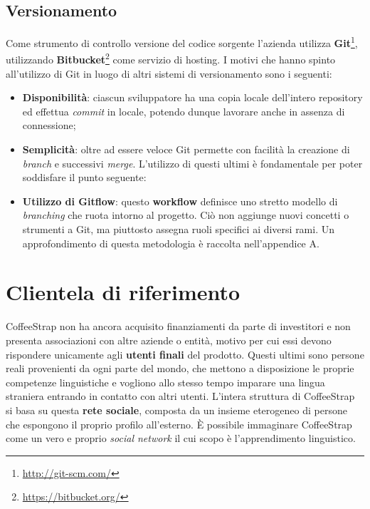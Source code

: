 \subsection{Versionamento}

Come strumento di controllo versione del codice sorgente l'azienda utilizza \textbf{\gls{Git}}\footnote{\url{http://git-scm.com/}}, utilizzando \textbf{Bitbucket}\footnote{\url{https://bitbucket.org/}} come servizio di hosting. I motivi che hanno spinto all'utilizzo di Git in luogo di altri sistemi di versionamento sono i seguenti:

\begin{itemize}

\item \textbf{Disponibilità}: ciascun sviluppatore ha una copia locale dell'intero repository ed effettua \textit{\gls{commit}} in locale, potendo dunque lavorare anche in assenza di connessione;

\item \textbf{Semplicità}: oltre ad essere veloce Git permette con facilità la creazione di \textit{branch} e successivi \textit{\gls{merge}}. L'utilizzo di questi ultimi è fondamentale per poter soddisfare il punto seguente:

\item \textbf{Utilizzo di Gitflow}: questo \textbf{workflow} definisce uno stretto modello di \textit{branching} che ruota intorno al progetto. Ciò non aggiunge nuovi concetti o strumenti a Git, ma piuttosto assegna ruoli specifici ai diversi rami. Un approfondimento di questa metodologia è raccolta nell'appendice A.

\end{itemize}

\section{Clientela di riferimento}

CoffeeStrap non ha ancora acquisito finanziamenti da parte di investitori e non presenta associazioni con altre aziende o entità, motivo per cui essi devono rispondere unicamente agli \textbf{utenti finali} del prodotto. Questi ultimi sono persone reali provenienti da ogni parte del mondo, che mettono a disposizione le proprie competenze linguistiche e vogliono allo stesso tempo imparare una lingua straniera entrando in contatto con altri utenti. L'intera struttura di CoffeeStrap si basa su questa \textbf{rete sociale}, composta da un insieme eterogeneo di persone che espongono il proprio profilo all'esterno. È possibile immaginare CoffeeStrap come un vero e proprio \textit{social network} il cui scopo è l'apprendimento linguistico.

